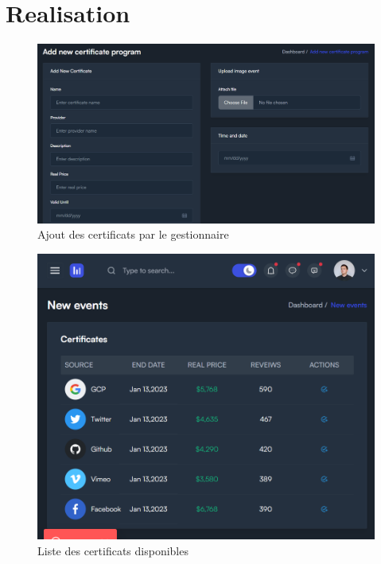 \documentclass[a4paper, 11pt, openany]{report}
\begin{document}
\section{Realisation}
\begin{figure}
\centering
\includegraphics[width=\textwidth]{admin-add-certif.png} 
\caption{Ajout des certificats par le gestionnaire}
\label{fig:Ajout_des_certificats}
\end{figure}


\begin{figure}
\centering
\includegraphics[width=\textwidth]{certifs-list.png} 
\caption{Liste des certificats disponibles}
\label{fig:certificates}
\end{figure}
\end{document}
